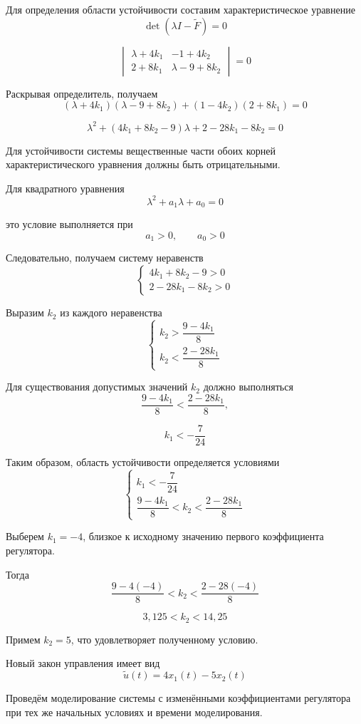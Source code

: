 Для определения области устойчивости составим
характеристическое уравнение
\[
\det(\lambda I-\widetilde F)=0
\]

\[
\begin{vmatrix}
\lambda+4k_1&-1+4k_2\\
2+8k_1&\lambda-9+8k_2
\end{vmatrix}=0
\]

Раскрывая определитель, получаем
\[
(\lambda+4k_1)(\lambda-9+8k_2)
+(1-4k_2)(2+8k_1)=0
\]

\[
\lambda^2+(4k_1+8k_2-9)\lambda
+2-28k_1-8k_2=0
\]

Для устойчивости системы вещественные части
обоих корней характеристического уравнения
должны быть отрицательными.

Для квадратного уравнения
\[
\lambda^2+a_1\lambda+a_0=0
\]

это условие выполняется при
\[
a_1>0,\qquad a_0>0
\]

Следовательно, получаем систему неравенств
\[
\begin{cases}
4k_1+8k_2-9>0\\
2-28k_1-8k_2>0
\end{cases}
\]

Выразим $k_2$ из каждого неравенства
\[
\begin{cases}
k_2>\dfrac{9-4k_1}{8}\\[3mm]
k_2<\dfrac{2-28k_1}{8}
\end{cases}
\]

Для существования допустимых значений $k_2$
должно выполняться
\[
\frac{9-4k_1}{8}<\frac{2-28k_1}{8},
\]

\[
k_1<-\frac{7}{24}
\]

Таким образом, область устойчивости определяется условиями
\[
\begin{cases}
k_1<-\dfrac{7}{24}\\[3mm]
\dfrac{9-4k_1}{8}<k_2<
\dfrac{2-28k_1}{8}
\end{cases}
\]

Выберем $k_1=-4$, близкое к исходному значению
первого коэффициента регулятора.

Тогда
\[
\frac{9-4(-4)}{8}<k_2<
\frac{2-28(-4)}{8}
\]

\[
3{,}125<k_2<14{,}25
\]

Примем $k_2=5$, что удовлетворяет полученному условию.

Новый закон управления имеет вид
\[
\widetilde u(t)=4x_1(t)-5x_2(t)
\]

Проведём моделирование системы с изменёнными коэффициентами
регулятора при тех же начальных условиях и времени моделирования.

